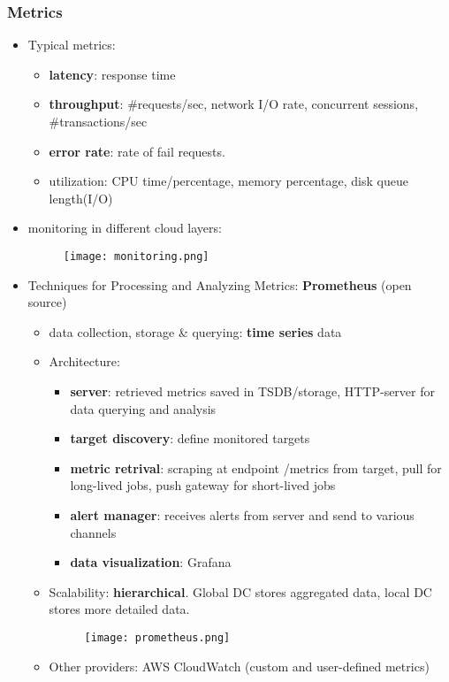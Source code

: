 \subsubsection{Metrics}
\begin{itemize}
	\item Typical metrics:
	\begin{itemize}
		\item \textbf{latency}: response time
		\item \textbf{throughput}: \#requests/sec, network I/O rate, concurrent sessions, \#transactions/sec 
		\item \textbf{error rate}: rate of fail requests. 
		\item utilization: CPU time/percentage, memory percentage, disk queue length(I/O)
	\end{itemize}
	
	\item monitoring in different cloud layers:
	\begin{figure}[H]
		\centering
		\texttt{[image: monitoring.png]}
	\end{figure}
	\item Techniques for Processing and Analyzing Metrics: \textbf{Prometheus} (open source)
	\begin{itemize}
		\item data collection, storage \& querying: \textbf{time series} data
		\item Architecture:
		\begin{itemize}
			\item \textbf{server}: retrieved metrics saved in TSDB/storage, HTTP-server for data querying and analysis
			\item \textbf{target discovery}: define monitored targets 
			\item \textbf{metric retrival}: scraping at endpoint /metrics from target, pull for long-lived jobs, push gateway for short-lived jobs
			\item \textbf{alert manager}: receives alerts from server and send to various channels
			\item \textbf{data visualization}: Grafana
			
		\end{itemize}
		\item Scalability: \textbf{hierarchical}. Global DC stores aggregated data, local DC stores more detailed data.
		\begin{figure}[H]
			\centering
			\texttt{[image: prometheus.png]}
		\end{figure}
		\item Other providers: AWS CloudWatch (custom and user-defined metrics)
	\end{itemize}
\end{itemize}

